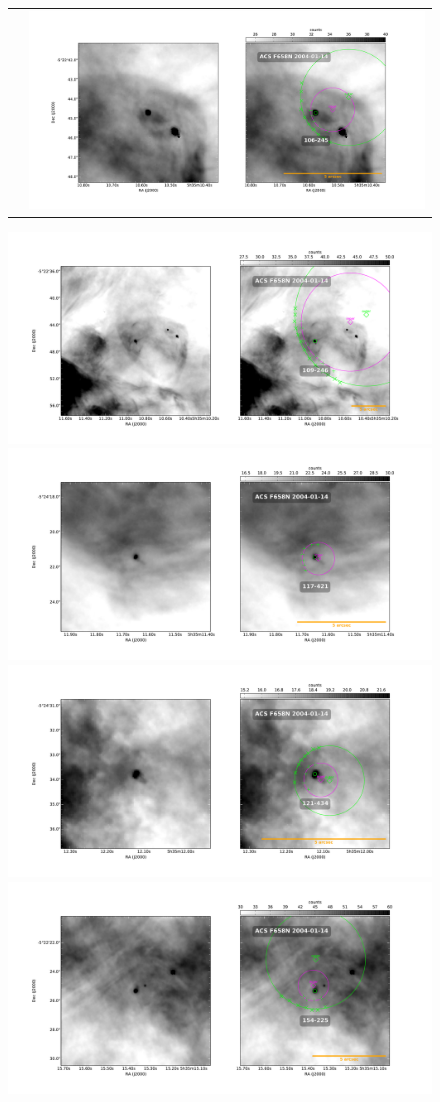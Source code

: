 \documentclass{article}
\begin{document}
\begin{figure}[htp]
\begin{tabular}{l l}
   &\includegraphics[width=0.7\linewidth]{j8oc01010_wcs/106-245-Bally_01-images.pdf}
\\
\end{tabular}
\end{figure}

\begin{figure}
  \centering

   \includegraphics[width=0.5\linewidth]{j8oc01010_wcs/109-246-Bally_01-images.pdf}
   \includegraphics[width=0.5\linewidth]{j8oc01010_wcs/117-421-Bally_01-images.pdf}
   \includegraphics[width=0.5\linewidth]{j8oc01010_wcs/121-434-Bally_01-images.pdf}
   \includegraphics[width=0.5\linewidth]{j8oc01010_wcs/154-225-Bally_01-images.pdf}

\end{figure}
\end{document}
